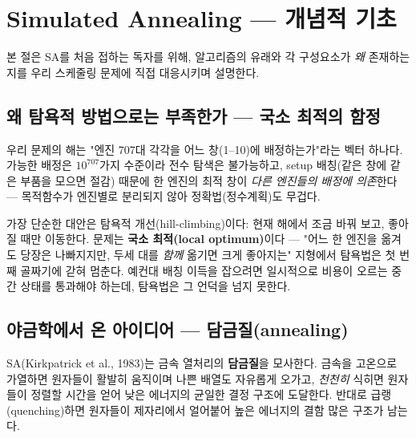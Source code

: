 \documentclass[11pt]{article}
\begin{document}
\section{Simulated Annealing — 개념적 기초}

본 절은 SA를 처음 접하는 독자를 위해, 알고리즘의 유래와 각 구성요소가 \emph{왜} 존재하는지를
우리 스케줄링 문제에 직접 대응시키며 설명한다.

\subsection{왜 탐욕적 방법으로는 부족한가 — 국소 최적의 함정}

우리 문제의 해는 "엔진 707대 각각을 어느 창(1--10)에 배정하는가"라는 벡터 하나다.
가능한 배정은 $10^{707}$가지 수준이라 전수 탐색은 불가능하고,
setup 배칭(같은 창에 같은 부품을 모으면 절감) 때문에 한 엔진의 최적 창이 \emph{다른 엔진들의 배정에 의존}한다 —
목적함수가 엔진별로 분리되지 않아 정확법(정수계획)도 무겁다.

가장 단순한 대안은 탐욕적 개선(hill-climbing)이다: 현재 해에서 조금 바꿔 보고, 좋아질 때만 이동한다.
문제는 \textbf{국소 최적(local optimum)}이다 —
"어느 한 엔진을 옮겨도 당장은 나빠지지만, 두세 대를 \emph{함께} 옮기면 크게 좋아지는" 지형에서
탐욕법은 첫 번째 골짜기에 갇혀 멈춘다.
예컨대 배칭 이득을 잡으려면 일시적으로 비용이 오르는 중간 상태를 통과해야 하는데, 탐욕법은 그 언덕을 넘지 못한다.

\subsection{야금학에서 온 아이디어 — 담금질(annealing)}

SA(Kirkpatrick et al., 1983)는 금속 열처리의 \textbf{담금질}을 모사한다.
금속을 고온으로 가열하면 원자들이 활발히 움직이며 나쁜 배열도 자유롭게 오가고,
\emph{천천히} 식히면 원자들이 정렬할 시간을 얻어 낮은 에너지의 균일한 결정 구조에 도달한다.
반대로 급랭(quenching)하면 원자들이 제자리에서 얼어붙어 높은 에너지의 결함 많은 구조가 남는다.
\end{document}
